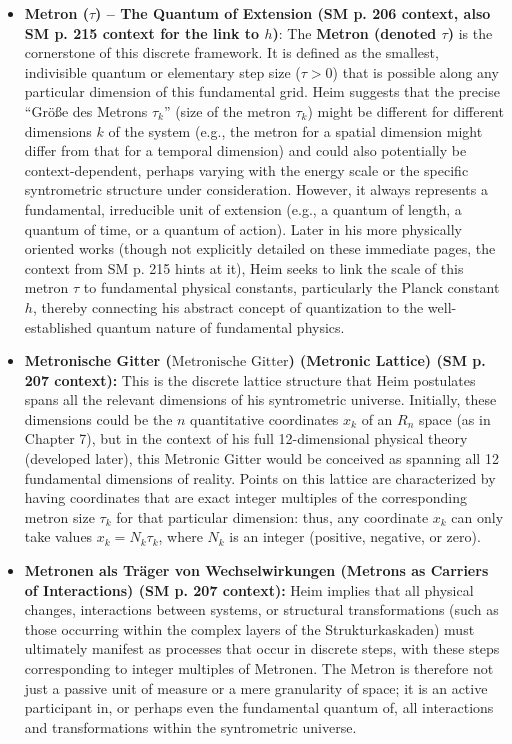 \documentclass[12pt]{article}
\newcommand{\q}[1]{\enquote{#1}}
\newcommand{\semantischermetrophor}{R_n}
\newcommand{\metron}{\tau}
\newcommand{\metronischegitter}{\text{Metronische Gitter}}
\begin{document}
\begin{itemize}
    \item \textbf{Metron (\( \metron \)) – The Quantum of Extension (SM p. 206 context, also SM p. 215 context for the link to \( h \))}:
    The \textbf{Metron (denoted \( \metron \))} is the cornerstone of this discrete framework. It is defined as the smallest, indivisible quantum or elementary step size (\( \metron > 0 \)) that is possible along any particular dimension of this fundamental grid. Heim suggests that the precise \q{Größe des Metrons \( \tau_k \)} (size of the metron \( \tau_k \)) might be different for different dimensions \( k \) of the system (e.g., the metron for a spatial dimension might differ from that for a temporal dimension) and could also potentially be context-dependent, perhaps varying with the energy scale or the specific syntrometric structure under consideration. However, it always represents a fundamental, irreducible unit of extension (e.g., a quantum of length, a quantum of time, or a quantum of action). Later in his more physically oriented works (though not explicitly detailed on these immediate pages, the context from SM p. 215 hints at it), Heim seeks to link the scale of this metron \( \metron \) to fundamental physical constants, particularly the Planck constant \( h \), thereby connecting his abstract concept of quantization to the well-established quantum nature of fundamental physics.

    \item \textbf{Metronische Gitter (\(\metronischegitter\)) (Metronic Lattice) (SM p. 207 context):}
    This is the discrete lattice structure that Heim postulates spans all the relevant dimensions of his syntrometric universe. Initially, these dimensions could be the \( n \) quantitative coordinates \( x_k \) of an \( \semantischermetrophor \) space (as in Chapter 7), but in the context of his full 12-dimensional physical theory (developed later), this Metronic Gitter would be conceived as spanning all 12 fundamental dimensions of reality. Points on this lattice are characterized by having coordinates that are exact integer multiples of the corresponding metron size \( \tau_k \) for that particular dimension: thus, any coordinate \( x_k \) can only take values \( x_k = N_k \tau_k \), where \( N_k \) is an integer (positive, negative, or zero).

    \item \textbf{Metronen als Träger von Wechselwirkungen (Metrons as Carriers of Interactions) (SM p. 207 context):}
    Heim implies that all physical changes, interactions between systems, or structural transformations (such as those occurring within the complex layers of the Strukturkaskaden) must ultimately manifest as processes that occur in discrete steps, with these steps corresponding to integer multiples of Metronen. The Metron is therefore not just a passive unit of measure or a mere granularity of space; it is an active participant in, or perhaps even the fundamental quantum of, all interactions and transformations within the syntrometric universe.


\end{itemize}
\end{document}
